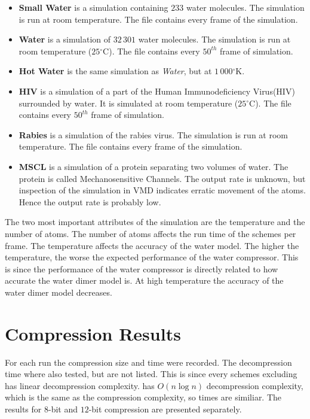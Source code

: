 \documentclass[a4paper]{report}
\newcommand{\degree}{\ensuremath{^\circ}}
\begin{document}
\begin{itemize}
\item{\textbf{Small Water}} is a simulation containing $233$ water
  molecules. The simulation is run at room temperature. The file contains
  every frame of the simulation.
\item{\textbf{Water}} is a simulation of $32\,301$ water molecules. The
  simulation is run at room temperature ($25\degree$C). The file contains
  every $50^{th}$ frame of simulation.
\item{\textbf{Hot Water}} is the same simulation as \emph{Water}, but at
  $1\,000\degree$K.
\item{\textbf{HIV}} is a simulation of a part of the Human Immunodeficiency
  Virus(HIV) surrounded by water. It is simulated at room temperature
  ($25\degree$C). The file contains every $50^{th}$ frame of simulation.
\item{\textbf{Rabies}} is a simulation of the rabies virus. The simulation is
  run at room temperature. The file contains every frame of the simulation.
\item{\textbf{MSCL}} is a simulation of a protein separating two volumes of
  water. The protein is called Mechanosensitive Channels. The output rate is
  unknown, but inspection of the simulation in VMD indicates erratic movement
  of the atoms. Hence the output rate is probably low.
\end{itemize}

The two most important attributes of the simulation are the temperature and
the number of atoms. The number of atoms affects the run time of the schemes
per frame. The temperature affects the accuracy of the water model. The higher
the temperature, the worse the expected performance of the water
compressor. This is since the performance of the water compressor is directly
related to how accurate the water dimer model is. At high temperature the
accuracy of the water dimer model decreases.

\section{Compression Results}

For each run the compression size and time were recorded. The decompression
time where also tested, but are not listed. This is since every schemes
excluding \citet{devillers2000gci} has linear decompression
complexity. \citet{devillers2000gci} has $O(n \log n)$ decompression
complexity, which is the same as the compression complexity, so times are
similiar. The results for $8$-bit and $12$-bit compression are presented
separately.
\end{document}
